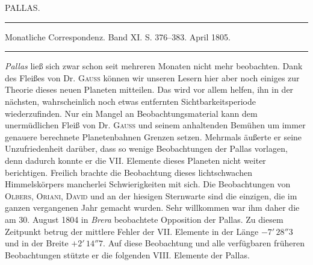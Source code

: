 \clearpage
{}
\hypertarget{native-267-lower}{}
\begin{center}
PALLAS.

\rule{0.5\linewidth}{0.4pt}

Monatliche Correspondenz. Band XI. S. 376–383. April 1805.

\rule{0.5\linewidth}{0.4pt}
\end{center}

\emph{Pallas} ließ sich zwar schon seit mehreren Monaten nicht mehr beobachten. Dank des Fleißes von Dr. \textsc{Gauss} können wir unseren Lesern hier aber noch einiges zur Theorie dieses neuen Planeten mitteilen. Das wird vor allem helfen, ihn in der nächsten, wahrscheinlich noch etwas entfernten Sichtbarkeitsperiode wiederzufinden. Nur ein Mangel an Beobachtungsmaterial kann dem unermüdlichen Fleiß von Dr. \textsc{Gauss} und seinem anhaltenden Bemühen um immer genauere berechnete Planetenbahnen Grenzen setzen. Mehrmals äußerte er seine Unzufriedenheit darüber, dass so wenige Beobachtungen der Pallas vorlagen, denn dadurch konnte er die VII. Elemente dieses Planeten nicht weiter berichtigen. Freilich brachte die Beobachtung dieses lichtschwachen Himmelskörpers mancherlei Schwierigkeiten mit sich. Die Beobachtungen von \textsc{Olbers}, \textsc{Oriani}, \textsc{David} und an der hiesigen Sternwarte sind die einzigen, die im ganzen vergangenen Jahr gemacht wurden. Sehr willkommen war ihm daher die am 30. August 1804 in \emph{Brera} beobachtete Opposition der Pallas. Zu diesem Zeitpunkt betrug der mittlere Fehler der VII. Elemente in der Länge $-7'\,28''3$ und in der Breite $+2'\,14''7$. Auf diese Beobachtung und alle verfügbaren früheren Beobachtungen stützte er die folgenden VIII. Elemente der Pallas.
